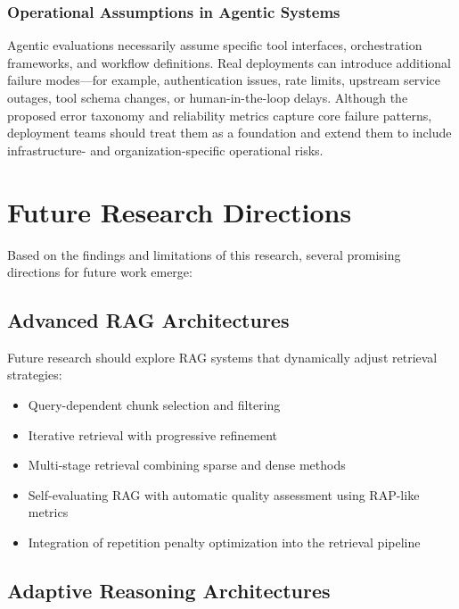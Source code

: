 \subsubsection{Operational Assumptions in Agentic Systems}
\label{sec:limitations-agentic}
Agentic evaluations necessarily assume specific tool interfaces, orchestration frameworks, and workflow definitions. Real deployments can introduce additional failure modes---for example, authentication issues, rate limits, upstream service outages, tool schema changes, or human-in-the-loop delays. Although the proposed error taxonomy and reliability metrics capture core failure patterns, deployment teams should treat them as a foundation and extend them to include infrastructure- and organization-specific operational risks.


\section{Future Research Directions}
\label{sec:future_directions}

Based on the findings and limitations of this research, several promising directions for future work emerge:

\subsection{Advanced RAG Architectures}

Future research should explore RAG systems that dynamically adjust retrieval strategies:
\begin{itemize}[leftmargin=*]
    \item Query-dependent chunk selection and filtering
    \item Iterative retrieval with progressive refinement
    \item Multi-stage retrieval combining sparse and dense methods
    \item Self-evaluating RAG with automatic quality assessment using RAP-like metrics
    \item Integration of repetition penalty optimization into the retrieval pipeline
\end{itemize}

\subsection{Adaptive Reasoning Architectures}


